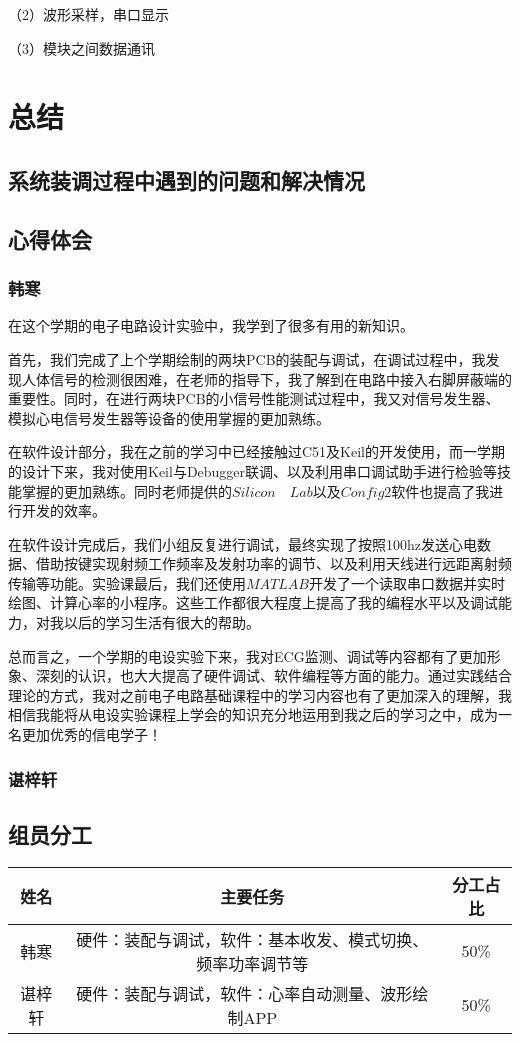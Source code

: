 \documentclass{zjureport}
\begin{document}
	（2）波形采样，串口显示   
	               
	（3）模块之间数据通讯      
	
	\section{总结}
	
	\subsection{系统装调过程中遇到的问题和解决情况}
	
	\subsection{心得体会}
	
	\subsubsection{韩寒}
	
	在这个学期的电子电路设计实验中，我学到了很多有用的新知识。
	
	首先，我们完成了上个学期绘制的两块PCB的装配与调试，在调试过程中，我发现人体信号的检测很困难，在老师的指导下，我了解到在电路中接入右脚屏蔽端的重要性。同时，在进行两块PCB的小信号性能测试过程中，我又对信号发生器、模拟心电信号发生器等设备的使用掌握的更加熟练。
	
	在软件设计部分，我在之前的学习中已经接触过C51及Keil的开发使用，而一学期的设计下来，我对使用Keil与Debugger联调、以及利用串口调试助手进行检验等技能掌握的更加熟练。同时老师提供的$Silicon \quad Lab$以及$Config2$软件也提高了我进行开发的效率。
	
	在软件设计完成后，我们小组反复进行调试，最终实现了按照100hz发送心电数据、借助按键实现射频工作频率及发射功率的调节、以及利用天线进行远距离射频传输等功能。实验课最后，我们还使用$MATLAB$开发了一个读取串口数据并实时绘图、计算心率的小程序。这些工作都很大程度上提高了我的编程水平以及调试能力，对我以后的学习生活有很大的帮助。
	
	总而言之，一个学期的电设实验下来，我对ECG监测、调试等内容都有了更加形象、深刻的认识，也大大提高了硬件调试、软件编程等方面的能力。通过实践结合理论的方式，我对之前电子电路基础课程中的学习内容也有了更加深入的理解，我相信我能将从电设实验课程上学会的知识充分地运用到我之后的学习之中，成为一名更加优秀的信电学子！
	
	\subsubsection{谌梓轩}
	
	
	
	
	
	\subsection{组员分工}
	
	\begin{table}[!ht]
		\centering
		\begin{tabular}{|c|c|c|}
			\hline
			姓名 & 主要任务 & 分工占比 \\ \hline
			韩寒 & 硬件：装配与调试，软件：基本收发、模式切换、频率功率调节等 & 50\%  \\ \hline
			谌梓轩 & 硬件：装配与调试，软件：心率自动测量、波形绘制APP & 50\%  \\ \hline
			
		\end{tabular}
	\end{table}
	
\end{document}
